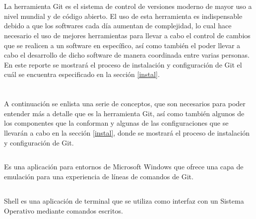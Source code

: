 \documentclass[10pt,a4paper]{article} %
\begin{document}
	\section{\color{colorIPN}{Introducción}}%
	{\large La herramienta Git es el sistema de control de versiones moderno de mayor uso a nivel mundial y de  c{\' o}digo abierto. El uso de esta herramienta es indispensable debido a que los softwares cada d{\' i}a aumentan de complejidad, lo cual hace necesario el uso de mejores herramientas para llevar a cabo el control de cambios que se realicen a un software en espec{\' i}fico, as{\' i} como tambi{\' e}n el poder llevar a cabo el desarrollo de dicho software de manera coordinada entre varias personas. En este reporte se mostrar{\' a} el proceso de instalación y configuración de Git el cuál se encuentra especificado en la secci{\' o}n \ref{instal}.}
	
	
	\pagebreak
	
	\section{\color{colorIPN}{Conceptos}}
	{\large A continuaci{\' o}n se enlista una serie de conceptos, que son necesarios para poder entender m{\' a}s a detalle que es la herramienta Git, as{\' i} como tambi{\' e}n algunos de los componentes que la conforman y algunas de las configuraciones que se llevar{\' a}n a cabo en la secci{\' o}n \ref{instal}, donde se mostrar{\' a} el proceso de instalaci{\' o}n y configuraci{\' o}n de Git.}
	
	\subsection{ \color{colorESCOM}{Git Bash}}
	{\large Es una aplicaci{\' o}n para entornos de Microsoft Windows que ofrece una capa de emulaci{\' o}n para una experiencia de l{\' i}neas de comandos de Git.}
	
	\subsection{ \color{colorESCOM}{Shell}}
	{\large Shell es una aplicaci{\' o}n de terminal que se utiliza como interfaz con un Sistema Operativo mediante comandos escritos.}
	
\end{document}
